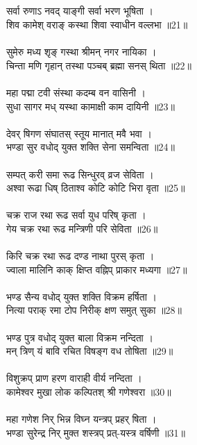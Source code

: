 \subsection{}
सर्वा रुणाऽ नवद् याङ्गी सर्वा भरण भूषिता ।\\
शिव कामेश् वराङ् कस्था शिवा स्वाधीन वल्लभा ॥21॥\\
\\
सुमेरु मध्य श‍ृङ् गस्था श्रीमन् नगर नायिका ।\\
चिन्ता मणि गृहान् तस्था पञ्चब् ब्रह्मा सनस् थिता ॥22॥\\
\\
महा पद्मा टवी संस्था कदम्ब वन वासिनी ।\\
सुधा सागर मध् यस्था कामाक्षी काम दायिनी ॥23॥\\
\\
देवर् षिगण संघातस् स्तूय मानात् मवै भवा ।\\
भण्डा सुर वधोद् युक्त शक्ति सेना समन्विता ॥24॥\\
\\
सम्पत् करी समा रूढ सिन्धुरव् व्रज सेविता ।\\
अश्वा रूढा धिष् ठिताश्व कोटि कोटि भिरा वृता ॥25॥\\
\\
चक्र राज रथा रूढ सर्वा युध परिष् कृता ।\\
गेय चक्र रथा रूढ मन्त्रिणी परि सेविता ॥26॥ \\
\\
किरि चक्र रथा रूढ दण्ड नाथा पुरस् कृता ।\\
ज्वाला मालिनि काक् क्षिप्त वह्निप् प्राकार मध्यगा ॥27॥\\
\\
भण्ड सैन्य वधोद् युक्त शक्ति विक्रम हर्षिता ।\\
नित्या पराक् रमा टोप निरीक् क्षण समुत् सुका ॥28॥\\
\\
भण्ड पुत्र वधोद् युक्त बाला विक्रम नन्दिता ।\\
मन् त्रिण् यं बावि रचित विषङ्ग वध तोषिता ॥29॥\\
\\
विशुक्रप् प्राण हरण वाराही वीर्य नन्दिता ।\\
कामेश्वर मुखा लोक कल्पितश् श्री गणेश्वरा ॥30॥\\
\\
महा गणेश निर् भिन्न विघ्न यन्त्रप् प्रहर् षिता ।\\
भण्डा सुरेन्द्र निर् मुक्त शस्त्रप् प्रत्-यस्त्र वर्षिणी ॥31॥\\
\\
